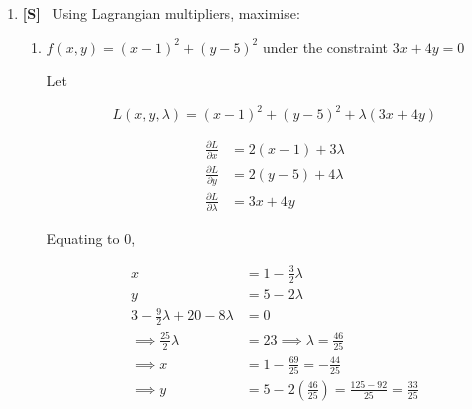 \documentclass[10pt,\jkfside,a4paper]{article}
\newcommand{\answer}[1]{
    \begin{tcolorbox}[colframe=black, colback=white, sharp corners, boxrule=0.2mm, breakable]
        #1
    \end{tcolorbox}
}
\newcommand{\qtype}[1]{\textbf{[#1]}~}
\begin{document}
\begin{enumerate}
{        and

        \[
            \frac{\partial L}{\partial P_i} = - \log{P_i} - 1 - \lambda_1 - \lambda_2 x_i
        \]

        Equating to 0, we get that

        \[
            P_i = e^{-1 - \lambda_1 - \lambda_2 x_i} = \frac{1}{e^{1 + \lambda_1 + \lambda_2 x_i}}
        \]

        Then

        \begin{align*}
            \sum_{i=0}^{n} P_i = 1 &= \sum_{i=0}^{n} e^{-1 - \lambda_1 - \lambda_2 x_i} \\
            &= e^{-1 - \lambda_1} \left( \sum_{i=0}^{n} e^{-\lambda_2 x_i} \right) \\
            \implies e^{-1 - \lambda_1} &= \frac{1}{\sum_{j} e^{-\lambda_2 x_j}} \\
            \implies P_i &= \frac{e^{-\lambda_2 x_i}}{\sum_{j} e^{-\lambda_2 x_j}}
        \end{align*}
    }

    \item
    \qtype{S}
    Using Lagrangian multipliers, maximise:
    \begin{enumerate}
        \item
        $f(x, y) = (x - 1)^2 + (y - 5)^2$ under the constraint $3x + 4y = 0$

        \answer{
            Let

            \[
                L(x, y, \lambda) = (x - 1)^2 + (y - 5)^2 + \lambda (3x + 4y)
            \]

            \begin{align*}
                \frac{\partial L}{\partial x} &= 2(x - 1) + 3\lambda \\
                \frac{\partial L}{\partial y} &= 2(y - 5) + 4\lambda \\
                \frac{\partial L}{\partial \lambda} &= 3x + 4y
            \end{align*}

            Equating to 0,

            \begin{align*}
                x &= 1 - \tfrac{3}{2}\lambda \\
                y &= 5 - 2\lambda \\
                3 - \tfrac{9}{2}\lambda + 20 - 8\lambda &= 0 \\
                \implies \tfrac{25}{2}\lambda &= 23 \implies \lambda = \tfrac{46}{25} \\
                \implies x &= 1 - \tfrac{69}{25} = -\tfrac{44}{25} \\
                \implies y &= 5 - 2\left(\tfrac{46}{25}\right) = \tfrac{125 - 92}{25} = \tfrac{33}{25}
            \end{align*}
        }


\end{enumerate}
\end{enumerate}
\end{document}
